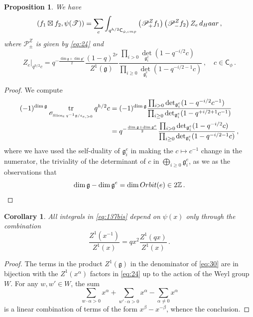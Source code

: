 \documentclass[14pt]{extarticle}
\newcommand{\Z}{\mathbb{Z}}
\newcommand{\bC}{\mathsf{C}}
\newcommand{\cT}{\mathscr{T}}
\newcommand{\cP}{\mathscr{P}}
\newcommand{\fg}{\mathfrak{g}}
\newcommand{\fc}{\mathfrak{c}}
\newcommand{\cO}{\mathscr{O}}
\newcommand{\comp}{\textup{cmp}}
\DeclareMathOperator{\tr}{tr}
\DeclareMathOperator{\Slice}{Slice}
\newtheorem{Proposition}[Lemma]{Proposition}
\newtheorem{Corollary}[Lemma]{Corollary}
\theoremstyle{definition}
\begin{document}
\begin{Proposition}\label{p_spectral_Z} 
  We have
  \begin{equation}
    \label{eq:137bis}
    (f_1 \boxtimes f_2, \psi(\cT)) =
    \sum_{e} 
    \int_{q^{h/2} \bC_{\phi,\comp}} \left(\cP^Z_+ f_1 \right)
    \left(\cP_{-}^Z f_2 \right) Z_e \, 
      d_\textup{Haar}  \,, 
    \end{equation}
    where $\cP^Z_\pm$ is given by \eqref{eq:24} and
    \begin{equation}
      \label{eq:30}
      Z_e \big|_{q^{h/2} c} = q^{-\frac{\dim \fg + \dim \fg^e}{2}} \frac{(1-q)^{2r}}{Z^1(\fg)}
      \frac{\prod_{i>0} \det_{\fg_i^e} (1-q^{-i/2} c )\phantom{\,\,\,\,\,}}
      {\prod_{i\ge 0} \det_{\fg_i^e}(1-q^{-i/2-1} c)} \,, \quad c \in \bC_{\phi} \,. 
    \end{equation}
\end{Proposition}

\begin{proof}
  We compute
  \begin{align}
    (-1)^{\dim\fg} \tr_{\cO_{\Slice_e q^{-1} \fg
  / \fc_{e,>0}}} q^{h/2} c & =
                                  (-1)^{\dim\fg}
 \frac{\prod_{i>0} \det_{\fg_i^e} (1-q^{-i/2} c^{-1} )\phantom{\,\,\,\,\,}}
                                  {\prod_{i\ge 0}
                             \det_{\fg_i^e}(1-q^{+i/2+1} c^{-1})}
    \notag \\
    & =
        q^{-\frac{\dim \fg + \dim \fg^e}{2}}                           
 \frac{\prod_{i>0} \det_{\fg_i^e} (1-q^{-i/2} c )\phantom{\,\,\,\,\,}}
                                  {\prod_{i\ge 0}
      \det_{\fg_i^e}(1-q^{-i/2-1} c)} \,, 
        \label{eq:32}
  \end{align}
  where we have used the self-duality of $\fg_i^e$ in
  making the $c\mapsto c^{-1}$ change in the numerator, the
  triviality of the determinant of $c$ in $\bigoplus_{i\ge 0} \fg_i^e$,
  as we as the observations that
  \[
    \dim \fg - \dim \fg^e = \dim \textup{Orbit}(e) \in 2 \Z \,.
  \]
\end{proof}

\begin{Corollary}\label{cZZ} 
All integrals in \eqref{eq:137bis} depend on $\psi(x)$ only through
the combination
%
\[
  \frac{Z^1(x^{-1})}{Z^1(x)} = q x^2 \frac{Z^1(qx)}{Z^1(x)} \,.
\] 
\end{Corollary}
\begin{proof}
The terms in the product $Z^1(\fg)$ in the denominator of
\eqref{eq:30} are in bijection with the $Z^1(x^\alpha)$ factors in
\eqref{eq:24} up to the action of the Weyl group $W$. For any
$w,w'\in W$, the sum
$$
\sum_{w\cdot \alpha >0} x^{\alpha} + \sum_{w' \cdot \alpha >0  }
x^{\alpha} - \sum_{\alpha \ne 0} x^{\alpha}
$$
is a linear combination of terms of the form $x^{\beta} - x^{-\beta}$,
whence the conclusion. 
\end{proof}
\end{document}
